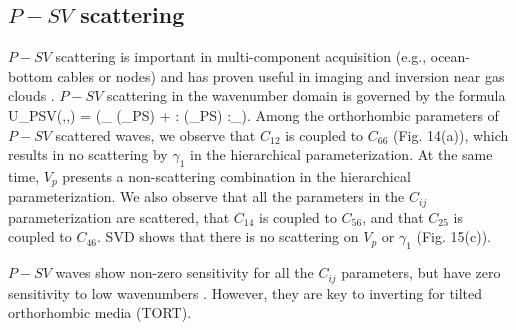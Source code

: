 \subsection{$P-SV$ scattering}
%
$P-SV$ scattering is important in multi-component acquisition (e.g., ocean-bottom cables or nodes) and has proven useful in imaging and inversion near gas clouds \citep{brossier2009,prieux2013}.
$P-SV$ scattering in the wavenumber domain is governed by the formula
\beq
\delta U_{PSV}(\sv,\gv,\omega) = (\sv\cdot\gv_{\theta} \delta \hat{\rho}(\Kv_{PS}) + \sv\sv : \delta \hat{\cv}(\Kv_{PS}) :\gv\gv_{\theta}).
\eeq
Among the orthorhombic parameters of $P-SV$ scattered waves, we observe that $C_{12}$ is coupled to $C_{66}$ (Fig. 14(a)), which results in no scattering by $\gamma_1$ in the hierarchical parameterization. At the same time, $V_p$ presents a non-scattering combination in the hierarchical parameterization. We also observe that all the parameters in the $C_{ij}$ parameterization are scattered, that $C_{14}$ is coupled to $C_{56}$, and that $C_{25}$ is coupled to $C_{46}$. SVD shows that there is no scattering on $V_p$ or $\gamma_1$ (Fig. 15(c)). 

%
$P-SV$ waves show non-zero sensitivity for all the $C_{ij}$ parameters, but have zero sensitivity to low wavenumbers \citep[e.g.,][]{podgornova}. However, they are key to inverting for tilted orthorhombic media (TORT).